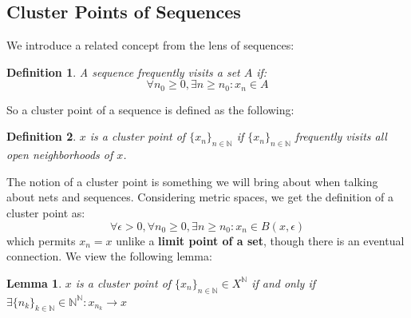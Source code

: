 \documentclass[10pt,letterpaper]{article} %
\newtheorem{lem}{Lemma}[section]
\newtheorem{defn}{Definition}[section]
\begin{document}
\subsection{Cluster Points of Sequences}
We introduce a related concept from the lens of sequences:
\begin{defn}
A sequence frequently visits a set $A$ if:
\begin{equation*}
\forall n_0 \geqslant 0, \exists n \geqslant n_0: x_n \in A
\end{equation*}
\end{defn}
So a cluster point of a sequence is defined as the following:
\begin{defn}
$x$ is a cluster point of $\{x_n\}_{n \in \mathbb{N}}$ if $\{x_n\}_{n \in \mathbb{N}}$ frequently visits all open neighborhoods of $x$.
\end{defn}
The notion of a cluster point is something we will bring about when talking about nets and sequences. Considering metric spaces, we get the definition of a cluster point as:
\begin{equation*}
\forall \epsilon > 0, \forall n_0 \geqslant 0, \exists n \geqslant n_0: x_n \in B(x, \epsilon)
\end{equation*}
which permits $x_n = x$ unlike a \textbf{limit point of a set}, though there is an eventual connection. We view the following lemma:
\begin{lem}
$x$ is a cluster point of $\{x_n\}_{n \in \mathbb{N}} \in X^\mathbb{N}$ if and only if $\exists \{n_k\}_{k \in \mathbb{N}} \in \mathbb{N}^\mathbb{N}: x_{n_k} \xrightarrow{} x$  
\end{lem}
\end{document}
